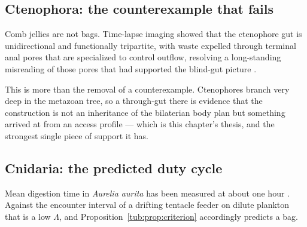 \begin{table}[t]
\centering\small
{}
\caption{Seven proposed counterexamples to the tube argument, set against
Proposition~\ref{tub:prop:criterion}.}
\label{tub:tab:cases}
\end{table}

\subsection{Ctenophora: the counterexample that fails}

Comb jellies are not bags. Time-lapse imaging showed that the ctenophore gut is
unidirectional and functionally tripartite, with waste expelled through terminal
anal pores that are specialized to control outflow, resolving a long-standing
misreading of those pores that had supported the blind-gut picture
\cite{presnell2016,giribet2016}.

This is more than the removal of a counterexample. Ctenophores branch very deep
in the metazoan tree, so a through-gut there is evidence that the construction is
not an inheritance of the bilaterian body plan but something arrived at from an
access profile --- which is this chapter's thesis, and the strongest single piece
of support it has.

\subsection{Cnidaria: the predicted duty cycle}

Mean digestion time in \emph{Aurelia aurita} has been measured at about one hour
\cite{ishii2001}. Against the encounter interval of a drifting tentacle feeder on
dilute plankton that is a low $\Lambda$, and
Proposition~\ref{tub:prop:criterion} accordingly predicts a bag.

